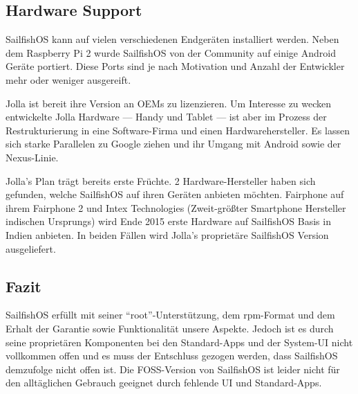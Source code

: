 \subsection{Hardware Support}
\mbox{SailfishOS} kann auf vielen verschiedenen Endgeräten installiert werden. Neben dem Raspberry Pi 2\thinspace\cite{online:sailfish-rpi2} wurde \mbox{SailfishOS} von der Community\thinspace\cite{online:sailfish-android-port} auf einige Android Geräte portiert. Diese Ports sind je nach Motivation und Anzahl der Entwickler mehr oder weniger ausgereift\thinspace\cite{online:sailfish-porters}.

Jolla ist bereit ihre Version an OEMs zu lizenzieren. Um Interesse zu wecken entwickelte Jolla Hardware --- Handy\thinspace\cite{online:jolla-smartphone} und Tablet\thinspace\cite{online:jolla-tablet} --- ist aber im Prozess der Restrukturierung in eine Software-Firma und einen Hardwarehersteller\thinspace\cite{online:jolla-googlelike}. Es lassen sich starke Parallelen zu Google ziehen und ihr Umgang mit Android sowie der Nexus-Linie.

Jolla's Plan trägt bereits erste Früchte. 2 Hardware-Hersteller haben sich gefunden, welche \mbox{SailfishOS} auf ihren Geräten anbieten möchten. Fairphone auf ihrem Fairphone 2\thinspace\cite{online:jolla-fairphone2} und Intex Technologies (Zweit-größter Smartphone Hersteller indischen Ursprungs) wird Ende 2015 erste Hardware auf \mbox{SailfishOS} Basis in Indien anbieten\thinspace\cite{online:jolla-intex-pdf}. In beiden Fällen wird Jolla's proprietäre \mbox{SailfishOS} Version ausgeliefert.
\newline

\subsection{Fazit}
\mbox{SailfishOS} erfüllt mit seiner \mbox{``root''-Unterstützung}, dem \mbox{rpm-Format} und dem Erhalt der Garantie sowie Funktionalität unsere Aspekte. Jedoch ist es durch seine proprietären Komponenten bei den \mbox{Standard-Apps} und der \mbox{System-UI} nicht vollkommen offen und es muss der Entschluss gezogen werden, dass \mbox{SailfishOS} demzufolge nicht offen ist. Die \mbox{FOSS-Version} von \mbox{SailfishOS} ist leider nicht für den alltäglichen Gebrauch geeignet durch fehlende UI und \mbox{Standard-Apps}.